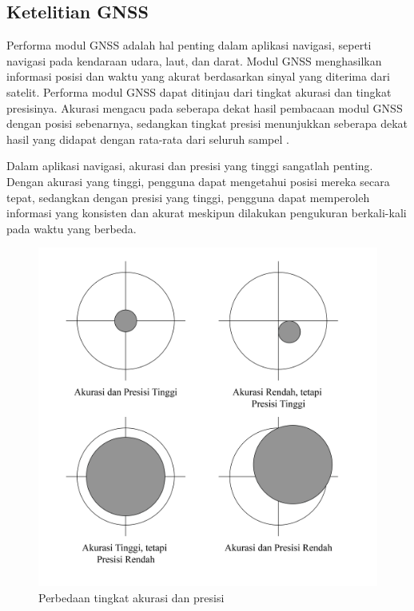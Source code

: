 \subsection{Ketelitian GNSS}
Performa modul GNSS adalah hal penting dalam aplikasi navigasi, seperti navigasi pada kendaraan udara, laut, dan darat. Modul GNSS menghasilkan informasi posisi dan waktu yang akurat berdasarkan sinyal yang diterima dari satelit. Performa modul GNSS dapat ditinjau dari tingkat akurasi dan tingkat presisinya. Akurasi mengacu pada seberapa dekat hasil pembacaan modul GNSS dengan posisi sebenarnya, sedangkan tingkat presisi menunjukkan seberapa dekat hasil yang didapat dengan rata-rata dari seluruh sampel \cite{Novatel2023}. 

Dalam aplikasi navigasi, akurasi dan presisi yang tinggi sangatlah penting. Dengan akurasi yang tinggi, pengguna dapat mengetahui posisi mereka secara tepat, sedangkan dengan presisi yang tinggi, pengguna dapat memperoleh informasi yang konsisten dan akurat meskipun dilakukan pengukuran berkali-kali pada waktu yang berbeda.

\begin{figure}[H]
	\centering
	\includegraphics[width=12cm]{contents/chapter-2/acc.png}
	\caption{Perbedaan tingkat akurasi dan presisi}
	\label{Fig: acc-and-prec-diff}
\end{figure}

